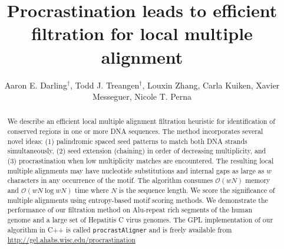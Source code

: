\documentclass{llncs}
\begin{document}
\frontmatter          %
%
\pagestyle{headings}  %

\mainmatter              %
%
\title{Procrastination leads to efficient filtration for local multiple alignment}
%
\author{Aaron E. Darling$^\dag$, Todd J. Treangen$^\dag$, Louxin Zhang, Carla Kuiken, Xavier Messeguer, Nicole T. Perna}
%
%

\maketitle


\begin{abstract}
We describe an efficient local multiple alignment filtration
heuristic for identification of conserved regions in one or more DNA
sequences. The method incorporates several novel ideas: (1)
palindromic spaced seed patterns to match both DNA strands
simultaneously, (2) seed extension (chaining) in order of decreasing
multiplicity, and (3) procrastination when low multiplicity matches
are encountered. The resulting local multiple alignments may have
nucleotide substitutions and internal gaps as large as $w$
characters in any occurrence of the motif. The algorithm consumes
$\mathcal{O}(wN)$ memory and $\mathcal{O}(wN \log wN)$ time where
$N$ is the sequence length. We score the significance of multiple
alignments using entropy-based motif scoring methods.  We
demonstrate the performance of our filtration method on Alu-repeat
rich segments of the human genome and a large set of Hepatitis C
virus genomes. The GPL implementation of our algorithm in C++ is
called \texttt{procrastAligner} and is freely available from
\url{http://gel.ahabs.wisc.edu/procrastination}
\end{abstract}
\end{document}
